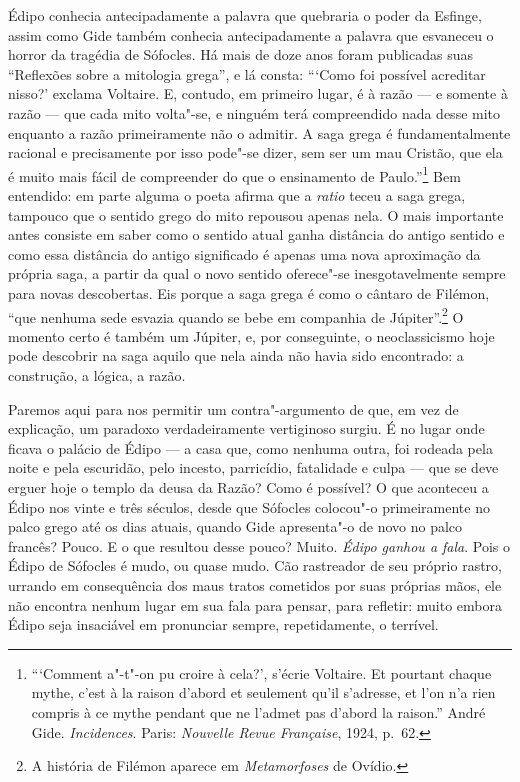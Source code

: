 Édipo conhecia antecipadamente a palavra que quebraria o poder da Esfinge,
assim como Gide também conhecia antecipadamente a palavra que
esvaneceu o horror da tragédia de Sófocles. Há mais de
doze anos foram publicadas suas ``Reflexões sobre a mitologia grega'', e lá
consta: ```Como foi possível acreditar nisso?' exclama Voltaire. E,
contudo, em primeiro lugar, é à razão --- e somente à razão --- que cada mito
volta"-se, e ninguém terá compreendido nada desse mito enquanto a razão primeiramente não
o admitir. A saga grega é fundamentalmente racional e precisamente por
isso pode"-se dizer, sem ser um mau Cristão, que ela é muito
mais fácil de compreender do que o ensinamento de Paulo.''\footnote{```Comment
  a"-t"-on pu croire à cela?', s'écrie Voltaire. Et pourtant chaque
  mythe, c'est à la raison d'abord et seulement qu'il s'adresse, et l'on
  n'a rien compris à ce mythe pendant que ne l'admet pas d'abord la
  raison.'' André Gide. \emph{Incidences}. Paris: \emph{Nouvelle Revue Française},
  1924, p.~62. \versal{[N.~T.]}} Bem entendido: em parte alguma o poeta afirma que a
\emph{ratio} teceu a saga grega, tampouco que o sentido grego do mito
repousou apenas nela. O mais importante antes consiste em saber como o
sentido atual ganha distância do antigo sentido e como essa distância do antigo
significado é apenas uma nova aproximação da própria saga, a partir da
qual o novo sentido oferece"-se inesgotavelmente sempre para novas
descobertas. Eis porque a saga grega é como o cântaro de Filémon, ``que
nenhuma sede esvazia quando se bebe em companhia de Júpiter''.\footnote{A história de Filémon aparece em \emph{Metamorfoses} de Ovídio. \versal{[N.~O.]}} O
momento certo é também um Júpiter, e, por conseguinte, o neoclassicismo
hoje pode descobrir na saga aquilo que nela ainda não havia sido
encontrado: a construção, a lógica, a razão.

Paremos aqui para nos permitir um contra"-argumento de que, em vez de explicação,
um paradoxo verdadeiramente vertiginoso surgiu. É no lugar onde
ficava o palácio de Édipo --- a casa que, como nenhuma outra, foi rodeada
pela noite e pela escuridão, pelo incesto, parricídio, fatalidade e
culpa --- que se deve erguer hoje o templo da deusa da Razão? Como é
possível? O que aconteceu a Édipo nos vinte e três séculos, desde que
Sófocles colocou"-o primeiramente no palco grego até os dias atuais,
quando Gide apresenta"-o de novo no palco francês? Pouco. E o que
resultou desse pouco? Muito. \emph{Édipo ganhou a fala}. Pois o Édipo de
Sófocles é mudo, ou quase mudo. Cão rastreador de seu próprio rastro,
urrando em consequência dos maus tratos cometidos por suas próprias
mãos, ele não encontra nenhum lugar em sua fala para pensar, para refletir: muito
embora Édipo seja insaciável em pronunciar sempre, repetidamente, o
terrível.

